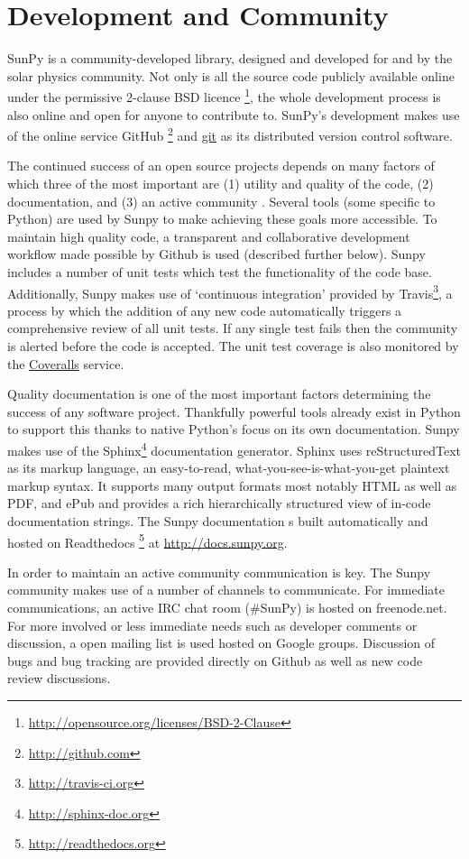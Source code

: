 \section{Development and Community}
SunPy is a community-developed library, designed and developed for and by 
the solar physics community. Not only is all the source code publicly available 
online under the permissive 2-clause BSD licence 
\footnote{\url{http://opensource.org/licenses/BSD-2-Clause}}, the whole 
development 
process is also online and open for anyone to contribute to.
SunPy's development makes use of the online 
service GitHub \footnote{\url{http://github.com}} and \href{http://git-scm.com/}{git} 
as its distributed version control software. 

The continued success of an open source projects depends on many factors of which 
three of the most important are (1) utility and quality of the code, (2) documentation, and (3) an
active community \cite{bangerth2013}. Several tools (some specific to Python) are used by
Sunpy to make achieving these goals more accessible. To maintain high quality code, a 
transparent and collaborative development workflow made possible by Github is used (described
further below). Sunpy includes a number of unit tests which test the functionality 
of the code base. Additionally, Sunpy makes use of `continuous integration' provided by
Travis\footnote{\url{http://travis-ci.org}}, a process by which the addition of any new code 
automatically triggers a comprehensive review of all unit tests. If any single test
fails then the community is alerted before the code is accepted. The unit test coverage is
also monitored by the \href{http://coveralls.io}{Coveralls} service.

Quality documentation is
one of the most important factors determining the success of any software project. 
Thankfully powerful tools already exist in Python to support this thanks to native
Python's focus on its own documentation. Sunpy makes use of the Sphinx\footnote{\url{http://sphinx-doc.org}}
documentation generator. Sphinx uses reStructuredText as its markup language, 
an easy-to-read, what-you-see-is-what-you-get plaintext markup syntax. It supports
many output formats most notably HTML as well as PDF, and ePub and provides a rich
hierarchically structured view of in-code documentation strings. The Sunpy documentation 
s built automatically and hosted on Readthedocs \footnote{\url{http://readthedocs.org}} 
at \url{http://docs.sunpy.org}. 

In order to maintain an active community communication is key.  The Sunpy community makes
use of a number of channels to communicate. For immediate communications, an active IRC chat
room (\#SunPy) is hosted on freenode.net. For more involved or less immediate needs such as
developer comments or discussion, a open mailing list is used hosted on Google groups. 
Discussion of bugs and bug tracking are provided directly on Github as well as new code
review discussions.

